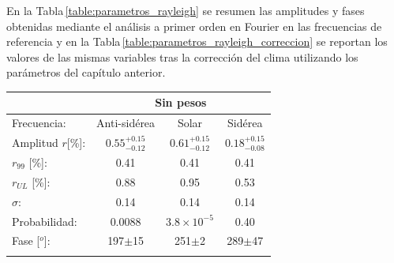 		
En la Tabla\,\ref{table:parametros_rayleigh} se resumen las amplitudes y fases obtenidas mediante el análisis a primer orden en Fourier en las frecuencias de referencia  y en la Tabla\,\ref{table:parametros_rayleigh_correccion} se reportan los valores de las mismas variables tras la corrección del clima utilizando los parámetros del capítulo anterior.
		\begin{table}[H]
		\centering
		\begin{tabular}{rc|c|c|}
			\cline{2-4}
			\multicolumn{1}{r|}{} & \multicolumn{3}{c|}{Sin pesos} 							 \\ \hline
			\multicolumn{1}{|l|}{Frecuencia:   }    & Anti-sidérea          & Solar          				& Sidérea     	 \\ \hline
			\multicolumn{1}{|l|}{Amplitud $r$[\%]:} & $0.55^{+0.15}_{-0.12}$& $0.61^{+0.15}_{-0.12}$        & $0.18^{+0.15}_{-0.08}$ \\
			\multicolumn{1}{|l|}{$r_{99}$ [\%]:   } & 0.41                  & 0.41                          & 0.41       \\
			\multicolumn{1}{|l|}{$r_{UL}$ [\%]:   } & 0.88                  & 0.95                          & 0.53       \\
			\multicolumn{1}{|l|}{$\sigma$:        } & 0.14                  & 0.14                          & 0.14          \\\hline
			\multicolumn{1}{|l|}{Probabilidad:    } & 0.0088                & $3.8\times 10^{-5}$                          & 0.40          \\
			\multicolumn{1}{|l|}{Fase [$^o$]:            } & 197$\pm$15            & 251$\pm$2                    & 289$\pm$47    \\\hline \\   \cline{2-4}
			

\end{tabular}
\end{table}
